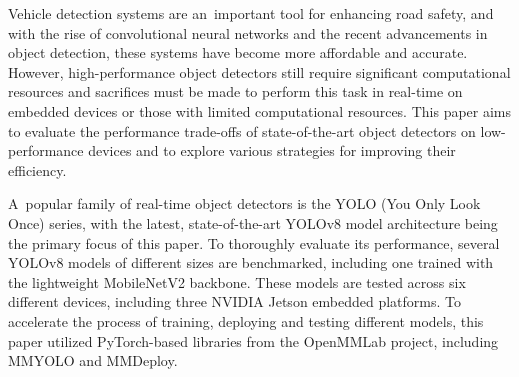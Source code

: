 

Vehicle detection systems are an~important tool for enhancing road safety, and
with the rise of convolutional neural networks and the recent advancements in
object detection, these systems have become more affordable and accurate.
However, high-performance object detectors still require significant
computational resources and sacrifices must be made to perform this task in
real-time on embedded devices or those with limited computational resources.
This paper aims to evaluate the performance trade-offs of state-of-the-art
object detectors on low-performance devices and to explore various strategies
for improving their efficiency.

%
%
A~popular family of real-time object detectors is the YOLO (You Only Look Once)
series, with the latest, state-of-the-art YOLOv8 model architecture being the
primary focus of this paper. To thoroughly evaluate its performance, several
YOLOv8 models of different sizes are benchmarked, including one trained with the
lightweight MobileNetV2 backbone. These models are tested across six different
devices, including three NVIDIA Jetson embedded platforms. To accelerate the
process of training, deploying and testing different models, this paper utilized
PyTorch-based libraries from the OpenMMLab project, including MMYOLO and
MMDeploy.

